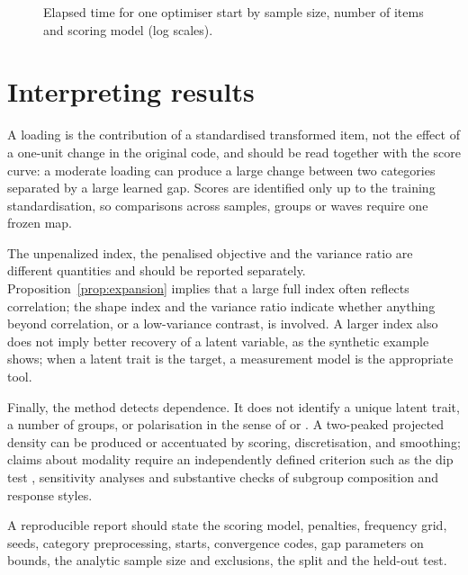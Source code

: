 \begin{figure}[htbp]
\centering
{}
\caption{Elapsed time for one optimiser start by sample size, number of items and scoring model (log scales).}
\label{fig:runtime}
\end{figure}

\section{Interpreting results}
A loading is the contribution of a standardised transformed item, not the effect of a one-unit change in the original code, and should be read together with the score curve: a moderate loading can produce a large change between two categories separated by a large learned gap. Scores are identified only up to the training standardisation, so comparisons across samples, groups or waves require one frozen map.

The unpenalized index, the penalised objective and the variance ratio are different quantities and should be reported separately. Proposition~\ref{prop:expansion} implies that a large full index often reflects correlation; the shape index and the variance ratio indicate whether anything beyond correlation, or a low-variance contrast, is involved. A larger index also does not imply better recovery of a latent variable, as the synthetic example shows; when a latent trait is the target, a measurement model is the appropriate tool.

Finally, the method detects dependence. It does not identify a unique latent trait, a number of groups, or polarisation in the sense of \citet{esteban1994} or \citet{dimaggio1996}. A two-peaked projected density can be produced or accentuated by scoring, discretisation, and smoothing; claims about modality require an independently defined criterion such as the dip test \citep{hartigan1985}, sensitivity analyses and substantive checks of subgroup composition and response styles.

A reproducible report should state the scoring model, penalties, frequency grid, seeds, category preprocessing, starts, convergence codes, gap parameters on bounds, the analytic sample size and exclusions, the split and the held-out test.

